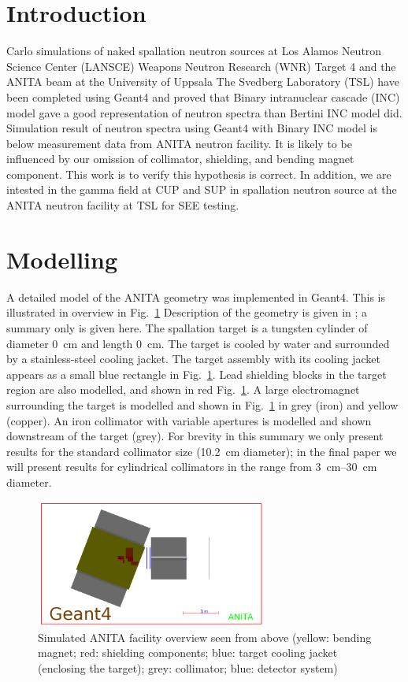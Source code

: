 \documentclass[12pt,journal]{IEEEtran}
\let\MYoriglatexcaption\caption
\renewcommand{\caption}[2][\relax]{\MYoriglatexcaption[#2]{#2}}
\begin{document}
\section{Introduction}
 Carlo simulations of naked spallation neutron sources at Los Alamos Neutron Science Center (LANSCE) Weapons Neutron Research (WNR) Target 4\cite{Wender87} and the ANITA beam at the University of Uppsala The Svedberg Laboratory (TSL) have been completed using Geant4 and proved that Binary intranuclear cascade (INC) model gave a good representation of neutron spectra than Bertini INC model did\cite{Platt13}. Simulation result of neutron spectra using Geant4 with Binary INC model is below measurement data from ANITA neutron facility. It is likely to be influenced by our omission of collimator, shielding, and bending magnet component. This work is to verify this hypothesis is correct. In addition, we are intested in the gamma field at CUP and SUP in spallation neutron source at the ANITA neutron facility at TSL for SEE testing.

\section{Modelling}

A detailed model of the ANITA geometry was implemented in Geant4.
This is illustrated in overview in Fig.~\ref{fig:ANITAoverview}
Description of the geometry is given in \cite{Prokofiev2009,Prokofiev14}; a summary only is given here.
The spallation target is a tungsten cylinder of diameter \SI{0}{\cm} and length \SI{0}{\cm}.
The target is cooled by water and surrounded by a stainless-steel cooling jacket.
The target assembly with its cooling jacket appears as a small blue rectangle in Fig.~\ref{fig:ANITAoverview}.
Lead shielding blocks in the target region are also modelled, and shown in red Fig.~\ref{fig:ANITAoverview}.
A large electromagnet surrounding the target is modelled and shown in Fig.~\ref{fig:ANITAoverview} in grey (iron) and yellow (copper).
An iron collimator with variable apertures is modelled  and shown downstream of the target (grey).
For brevity in this summary we only present results for the standard collimator size (\SI{10.2}{\cm} diameter); in the final paper we will present results for cylindrical collimators in the range from \SIrange{3}{30}{\cm} diameter.

\begin{figure}[!t]
	\centering
	\includegraphics[width=3in]{overview.png}
	\caption{Simulated ANITA facility overview seen from above (yellow: bending magnet; red: shielding components; blue: target cooling jacket (enclosing the target); grey: collimator; blue: detector system)}
	\label{fig:ANITAoverview}
\end{figure}
\end{document}
